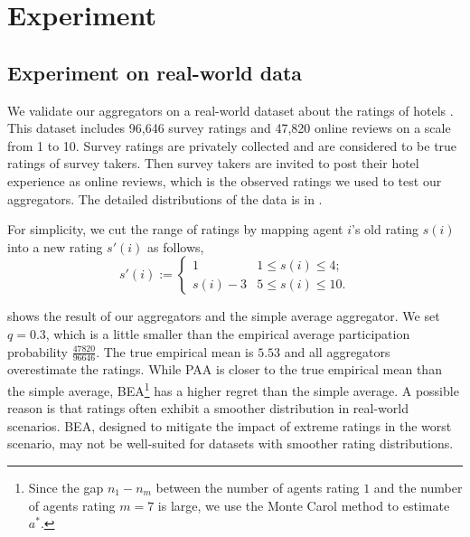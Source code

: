 \section{Experiment}
\label{sec:exp}
\subsection{Experiment on real-world data}

We validate our aggregators on a real-world dataset about the ratings of hotels \cite{karaman2021online}. This dataset includes  96,646 survey ratings and 47,820 online reviews on a scale from 1 to 10. Survey ratings are privately collected and are considered to be true ratings of survey takers. Then survey takers are invited to post their hotel experience as online reviews, which is the observed ratings we used to test our aggregators. The detailed distributions of the data is in .

For simplicity, we cut the range of ratings by mapping agent $i$'s old rating $s(i)$ into a new rating $s'(i)$ as follows,
\begin{equation*}
    s'(i):=\begin{cases}
    1 & 1\leq s(i) \leq 4;\\
    s(i)-3 & 5 \leq s(i)\leq 10.
    \end{cases}
\end{equation*}

\begin{table}[h]
\centering
{}
\caption{Result of PAA, BEA and the simple average (AVG) for $q=0.3$. PAA is closest to the ground truth.}
\label{table:res}
\end{table}

 shows the result of our aggregators and the simple average aggregator. We set $q=0.3$, which is a little smaller than the empirical average participation probability $\frac{47820}{96646}$. The true empirical mean is $5.53$ and all aggregators overestimate the ratings. While PAA is closer to the true empirical mean than the simple average, BEA\footnote{Since the gap $n_1-n_m$ between the number of agents rating $1$ and the number of agents rating $m=7$ is large, we use the Monte Carol method to estimate $a^*$.} has a higher regret than the simple average. A possible reason is that ratings often exhibit a smoother distribution in real-world scenarios. BEA, designed to mitigate the impact of extreme ratings in the worst scenario, may not be well-suited for datasets with smoother rating distributions.


